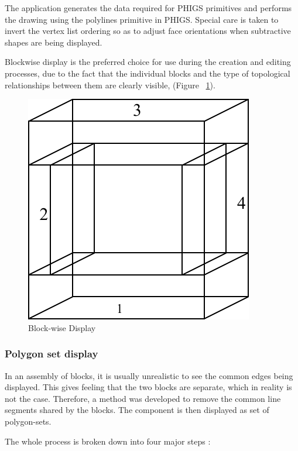 	The application generates the data required for PHIGS primitives and 
	performs the drawing using the polylines primitive in PHIGS. Special care 
	is taken to invert the vertex list ordering so as to adjust face 
	orientations when subtractive shapes are being displayed.


	Blockwise display is the preferred choice for use during the creation
	and editing processes, due to the fact that the individual blocks and
	the type of topological relationships between them are clearly visible,
	(Figure ~\ref{blkdisp}).
 
        \begin{figure}[htbp]
\includegraphics{BLKDISP.pdf}

            \caption{Block-wise Display}
            \label{blkdisp}
        \end{figure}

	\subsubsection{Polygon set display }


		In an assembly of blocks, it is usually unrealistic to see
	the common edges being displayed. This gives feeling that the two blocks 
	are separate, which in reality is not the case. Therefore, a method was 
	developed to remove the common line segments shared by the blocks. The 
	component is then displayed as set of polygon-sets. 


	The whole process is broken down into four major steps :

